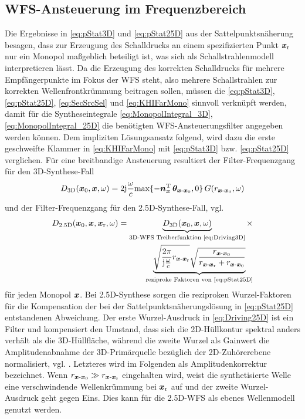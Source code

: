 \subsection{WFS-Ansteuerung im Frequenzbereich}
%
Die Ergebnisse in \Glg\eqref{eq:pStat3D} und \eqref{eq:pStat25D} aus der
Sattelpunktsnäherung besagen, dass zur Erzeugung des Schalldrucks
an einem spezifizierten Punkt $\bm{x}_\mathrm{r}$ nur ein Monopol maßgeblich beteiligt ist,
was sich als Schallstrahlenmodell interpretieren lässt.
%
Da die Erzeugung des korrekten Schalldrucks für mehrere Empfängerpunkte im Fokus
der WFS steht, also mehrere Schallstrahlen zur korrekten Wellenfrontkrümmung
beitragen sollen, müssen die \Glgn\eqref{eq:pStat3D}, \eqref{eq:pStat25D},
\eqref{eq:SecSrcSel} und
\eqref{eq:KHIFarMono} sinnvoll verknüpft werden, damit für die Syntheseintegrale
\eqref{eq:MonopolIntegral_3D}, \eqref{eq:MonopolIntegral_25D}
die benötigten WFS-Ansteuerungsfilter angegeben
werden können.
%
Dem impliziten Lösungsansatz folgend, wird dazu die erste
geschweifte Klammer in \Glg\eqref{eq:KHIFarMono} mit \eqref{eq:pStat3D} bzw.
\eqref{eq:pStat25D} verglichen.
%
Für eine breitbandige Ansteuerung resultiert der Filter-Frequenzgang
für den 3D-Synthese-Fall
%
\begin{align}
D_\text{3D}(\xp,\xs,\omega) = 2\im\wc \mathrm{max}\{-\nxT \, \bm{\theta}_{\xs\text{-}\xp}, 0\} \, G(r_{\xs\text{-}\xp},\omega)
\label{eq:Driving3D}
\end{align}
%
und der Filter-Frequenzgang für den 2.5D-Synthese-Fall, vgl. \cite{Deregowski1983,Bleistein1986}
%
\begin{align}
D_\text{2.5D}(\xp, \xs, \xr,\omega) = \underbrace{D_\text{3D}(\xp,\xs,\omega)}_{\text{3D-WFS Treiberfunktion \eqref{eq:Driving3D}}} \times\label{eq:Driving25D}\\
\underbrace{\sqrt{\frac{2\pi}{\im\wc} r_{\xs\text{-}\xr}}
\sqrt{\frac{r_{\xs\text{-}\xp}}{r_{\xs\text{-}\xr} + r_{\xs\text{-}\xp}}}}_{\text{reziproke Faktoren von \eqref{eq:pStat25D}}}\nonumber
\end{align}
%
für jeden Monopol $\bm{x}$.
%
Bei 2.5D-Synthese sorgen die reziproken Wurzel-Faktoren
für die Kompensation der bei der Sattelpunktsnäherungslösung in \Glg\eqref{eq:pStat25D}
entstandenen Abweichung.
%
Der erste Wurzel-Ausdruck in \Glg\eqref{eq:Driving25D} ist ein Filter und
kompensiert den Umstand,
dass sich die 2D-Hüllkontur spektral anders verhält als die 3D-Hüllfläche,
während die zweite Wurzel als Gainwert die Amplitudenabnahme der 3D-Primärquelle
bezüglich der 2D-Zuhörerebene normalisiert, vgl. \cite[Kap.~4.1.3]{Firtha2019_diss}.
%
Letzteres wird im Folgenden als Amplitudenkorrektur bezeichnet.
%
Wenn $r_{\bm{x}\text{-}\bm{x}_\mathrm{0}} \gg r_{\bm{x}\text{-}\bm{x}_\mathrm{r}}$ eingehalten wird, weist die
synthetisierte Welle eine verschwindende Wellenkrümmung bei $\bm{x}_\mathrm{r}$ auf und
der zweite Wurzel-Ausdruck geht gegen Eins.
%
Dies kann für die 2.5D-WFS als ebenes Wellenmodell genutzt werden.




